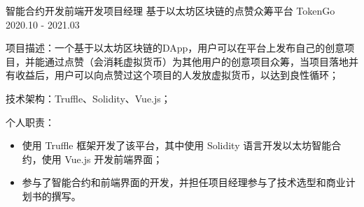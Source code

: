 \begin{cventries}
  \cventry
    {智能合约开发{\enskip\cdotp\enskip}前端开发{\enskip\cdotp\enskip}项目经理} %
    {基于以太坊区块链的点赞众筹平台 TokenGo} %
    {2020.10 - 2021.03} %
    {} %
    {
      \begin{cvitems}
        \item {项目描述：一个基于以太坊区块链的DApp，用户可以在平台上发布自己的创意项目，并能通过点赞（会消耗虚拟货币）为其他用户的创意项目众筹，当项目落地并有收益后，用户可以向点赞过这个项目的人发放虚拟货币，以达到良性循环；} 
        \item {技术架构：Truffle、Solidity、Vue.js；}
        \item {个人职责：}
          \begin{itemize}
            \item {使用 Truffle 框架开发了该平台，其中使用 Solidity 语言开发以太坊智能合约，使用 Vue.js 开发前端界面；}
            \item {参与了智能合约和前端界面的开发，并担任项目经理参与了技术选型和商业计划书的撰写。}
          \end{itemize}
      \end{cvitems}
    }

\end{cventries}
